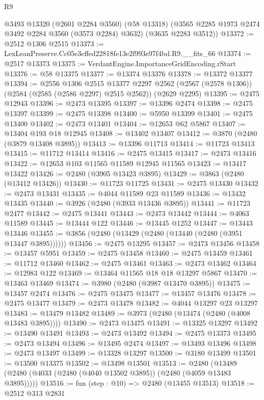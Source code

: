\begin{lexlean}{R9}
\begin{coremodule}
      @3493
      @13320
      (@2601 @2284 @3560)
      (@58 @13318)
      (@3565 @2285 @1973 @2474 @3492 @2284 @3560 (@3573 @2284) @3632)
      (@3635 @2283 @3512))
@13372 := @2512 @1306 @2515
@13373 := LexLeanPreserve.Cc05e3effed22818fe13e2f993e97f4bd.R9.__fits_66
@13374 := @2517 @13373
@13375 := VerdantEngine.ImportanceGridEncoding.rStart
@13376 := @58 @13375
@13377 := @13374 @13376
@13378 := @13372 @13377
@13394 := @2556
    @1306
    @2515
    @13377
    @2297
    @2562
    (@2567 (@2578 @1306))
    (@2584 (@2585 (@2586 @2297) @2515 @2562))
    (@2629 @2295)
@13395 := @2475 @12943
@13396 := @2473 @13395
@13397 := @13396 @2474
@13398 := @2475 @13397
@13399 := @2475 @13398
@13400 := @5950 @13399
@13401 := @2475 @13400
@13402 := @2473 @13401
@13404 := @12653 @62 @5867
@13407 := @13404 @193 @18 @12945
@13408 := @13402 @13407
@13412 := @3870 (@2480 (@3879 @13408 @3895))
@13413 := @13396 @11713
@13414 := @11723 @13413
@13415 := @11712 @13414
@13416 := @2475 @13415
@13417 := @2473 @13416
@13422 := @12653 @103 @11565 @11589 @12945 @11565
@13423 := @13417 @13422
@13426 := @2480 (@3905 @13423 @3895)
@13429 := @3863 (@2480 (@13412 @13426))
@13430 := @11723 @11725
@13431 := @2475 @13430
@13432 := @2473 @13431
@13435 := @4044 @11589 @23 @11589
@13436 := @13432 @13435
@13440 := @3926 (@2480 (@3933 @13436 @3895))
@13441 := @11723 @2477
@13442 := @2475 @13441
@13443 := @2473 @13442
@13444 := @4063 @11589
@13445 := @13444 @122
@13446 := @13445 @1252
@13447 := @13443 @13446
@13455 := @3856 (@2480 (@13429 (@2480 (@13440 (@2480 (@3951 @13447 @3895))))))
@13456 := @2475 @13295
@13457 := @2473 @13456
@13458 := @13457 @5951
@13459 := @2475 @13458
@13460 := @2475 @13459
@13461 := @11712 @13460
@13462 := @2475 @13461
@13463 := @2473 @13462
@13464 := @12983 @122
@13469 := @13464 @11565 @18 @18 @13297 @5867
@13470 := @13463 @13469
@13474 := @3980 (@2480 (@3987 @13470 @3895))
@13475 := @13457 @2474
@13476 := @2475 @13475
@13477 := @13457 @13476
@13478 := @2475 @13477
@13479 := @2473 @13478
@13482 := @4044 @13297 @23 @13297
@13483 := @13479 @13482
@13489 := @3973 (@2480 (@13474 (@2480 (@4008 @13483 @3895))))
@13490 := @2473 @13475
@13491 := @13325 @13297
@13492 := @13490 @13491
@13493 := @2473 @13492
@13494 := @2475 @13373
@13495 := @2473 @13494
@13496 := @13495 @2474
@13497 := @13493 @13496
@13498 := @2473 @13497
@13499 := @13328 @13297
@13500 := @3180 @13499
@13501 := @13500 @13375
@13502 := @13498 @13501
@13513 := @2480 (@13489 (@2480 (@4033 (@2480 (@4040 @13502 @3895)) (@2480 (@4059 @13483 @3895)))))
@13516 := fun (step : @10) => @2480 (@13455 @13513)
@13518 := @2512 @313 @2831

\end{coremodule}
\end{lexlean}
